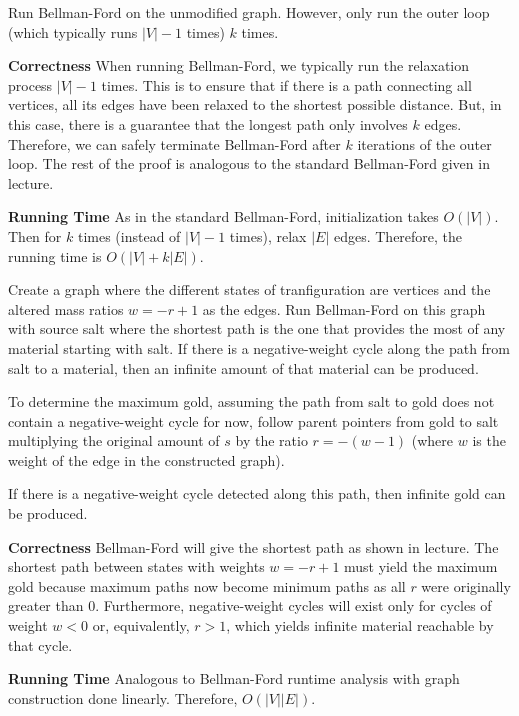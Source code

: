 \documentclass[12pt,twoside]{article}
\begin{document}
\begin{problems}
\begin{problemparts}
\end{problemparts}

\newpage

 Run Bellman-Ford on the unmodified graph. However,
only run the outer loop (which typically runs $|V| - 1$ times) $k$ times.

{\bf Correctness} When running Bellman-Ford, we typically run the relaxation
process $|V| - 1$ times. This is to ensure that if there is a path connecting all
vertices, all its edges have been relaxed to the shortest possible distance.
But, in this case, there is a guarantee that the longest path only involves
$k$ edges. Therefore, we can safely terminate Bellman-Ford after $k$
iterations of the outer loop. The rest of the proof is analogous to the
standard Bellman-Ford given in lecture.

{\bf Running Time} As in the standard Bellman-Ford, initialization takes
$O(|V|)$. Then for $k$ times (instead of $|V| - 1$ times), relax $|E|$ edges.
Therefore, the running time is $O(|V| + k|E|)$.

 Create a graph where the different states of
tranfiguration are vertices and the altered mass ratios $w = -r + 1$ as the
edges. Run Bellman-Ford on this graph with source salt where the shortest
path is the one that provides the most of any material starting with salt. If
there is a negative-weight cycle along the path from salt to a material, then
an infinite amount of that material can be produced.

To determine the maximum gold, assuming the path from salt to gold does not
contain a negative-weight cycle for now, follow parent pointers from gold to
salt multiplying the original amount of $s$ by the ratio $r = -(w - 1)$
(where $w$ is the weight of the edge in the constructed graph).

If there is a negative-weight cycle detected along this path, then infinite
gold can be produced.

{\bf Correctness} Bellman-Ford will give the shortest path as shown in
lecture. The shortest path between states with weights $w = -r + 1$ must
yield the maximum gold because maximum paths now become minimum paths as all
$r$ were originally greater than $0$. Furthermore, negative-weight cycles
will exist only for cycles of weight $w < 0$ or, equivalently, $r > 1$, which
yields infinite material reachable by that cycle.

{\bf Running Time} Analogous to Bellman-Ford runtime analysis with graph
construction done linearly. Therefore, $O(|V||E|)$.


\end{problems}
\end{document}
